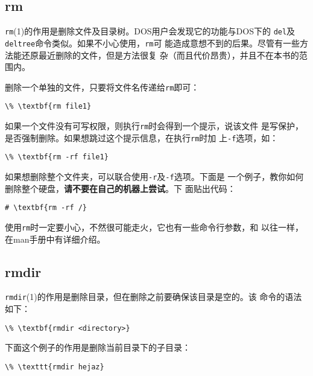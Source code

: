 \subsection{rm}
\label{sec:handlingFilesAndDirectories:deletion:rm}

\texttt{rm}(1)的作用是删除文件及目录树。DOS用户会发现它的功能与DOS下的
\texttt{del}及\texttt{deltree}命令类似。如果不小心使用，\texttt{rm}可
能造成意想不到的后果。尽管有一些方法能还原最近删除的文件，但是方法很复
杂（而且代价昂贵），并且不在本书的范围内。

删除一个单独的文件，只要将文件名传递给\texttt{rm}即可：
\begin{Verbatim}[frame=single, commandchars=\\\{\}]
\% \textbf{rm file1}
\end{Verbatim}

如果一个文件没有可写权限，则执行\texttt{rm}时会得到一个提示，说该文件
是写保护，是否强制删除。如果想跳过这个提示信息，在执行\texttt{rm}时加
上\texttt{-f}选项，如：
\begin{Verbatim}[frame=single, commandchars=\\\{\}]
\% \textbf{rm -rf file1}
\end{Verbatim}

如果想删除整个文件夹，可以联合使用\texttt{-r}及\texttt{-f}选项。下面是
一个例子，教你如何删除整个硬盘，\textbf{请不要在自己的机器上尝试}。下
面贴出代码：
\begin{Verbatim}[frame=single, commandchars=\\\{\}]
# \textbf{rm -rf /}
\end{Verbatim}

使用\texttt{rm}时一定要小心，不然很可能走火，它也有一些命令行参数，和
以往一样，在man手册中有详细介绍。

\subsection{rmdir}
\label{sec:handlingFilesAndDirectories:deletion:rmdir}

\texttt{rmdir}(1)的作用是删除目录，但在删除之前要确保该目录是空的。该
命令的语法如下：
\begin{Verbatim}[frame=single, commandchars=\\\{\}]
\% \textbf{rmdir <directory>}
\end{Verbatim}

下面这个例子的作用是删除当前目录下的子目录：
\begin{Verbatim}[frame=single, commandchars=\\\{\}]
\% \texttt{rmdir hejaz}
\end{Verbatim}

